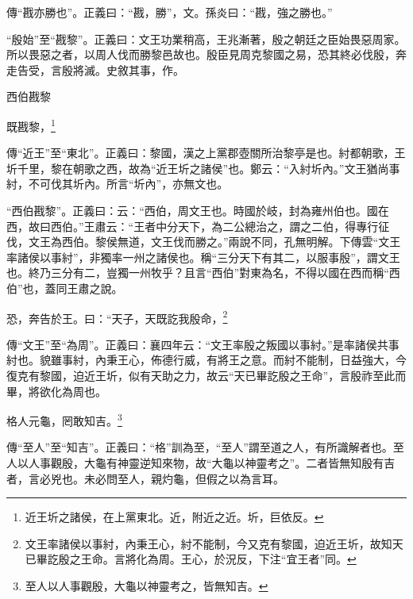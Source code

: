 {\noindent\zhuan{}\fzbyks 傳“戡亦勝也”。正義曰：“戡，勝”，文。孫炎曰：“戡，強之勝也。” \par}

{\noindent\shu{}\fzkt “殷始”至“戡黎”。正義曰：文王功業稍高，王兆漸著，殷之朝廷之臣始畏惡周家。所以畏惡之者，以周人伐而勝黎邑故也。殷臣見周克黎國之易，恐其終必伐殷，奔走告受，言殷將滅。史敘其事，作。 \par}

西伯戡黎

既戡黎，\footnote{近王圻之諸侯，在上黨東北。近，附近之近。圻，巨依反。}


{\noindent\zhuan{}\fzbyks 傳“近王”至“東北”。正義曰：黎國，漢之上黨郡壺關所治黎亭是也。紂都朝歌，王圻千里，黎在朝歌之西，故為“近王圻之諸侯”也。鄭云：“入紂圻內。”文王猶尚事紂，不可伐其圻內。所言“圻內”，亦無文也。 \par}

{\noindent\shu{}\fzkt “西伯戡黎”。正義曰：云：“西伯，周文王也。時國於岐，封為雍州伯也。國在西，故曰西伯。”王肅云：“王者中分天下，為二公總治之，謂之二伯，得專行征伐，文王為西伯。黎侯無道，文王伐而勝之。”兩說不同，孔無明解。下傳雲“文王率諸侯以事紂”，非獨率一州之諸侯也。稱“三分天下有其二，以服事殷”，謂文王也。終乃三分有二，豈獨一州牧乎？且言“西伯”對東為名，不得以國在西而稱“西伯”也，蓋同王肅之說。 \par}

恐，奔告於王。曰：“天子，天既訖我殷命，\footnote{文王率諸侯以事紂，內秉王心，紂不能制，今又克有黎國，迫近王圻，故知天已畢訖殷之王命。言將化為周。王心，於況反，下注“宜王者”同。}

{\noindent\zhuan{}\fzbyks 傳“文王”至“為周”。正義曰：襄四年云：“文王率殷之叛國以事紂。”是率諸侯共事紂也。貌雖事紂，內秉王心，佈德行威，有將王之意。而紂不能制，日益強大，今復克有黎國，迫近王圻，似有天助之力，故云“天已畢訖殷之王命”，言殷祚至此而畢，將欲化為周也。 \par}

格人元龜，罔敢知吉。\footnote{至人以人事觀殷，大龜以神靈考之，皆無知吉。}

{\noindent\zhuan{}\fzbyks 傳“至人”至“知吉”。正義曰：“格”訓為至，“至人”謂至道之人，有所識解者也。至人以人事觀殷，大龜有神靈逆知來物，故“大龜以神靈考之”。二者皆無知殷有吉者，言必兇也。未必問至人，親灼龜，但假之以為言耳。 \par}

